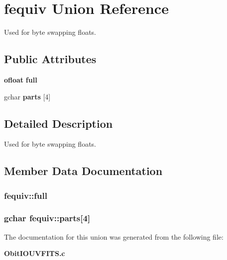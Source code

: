\section{fequiv Union Reference}
\label{unionfequiv}
Used for byte swapping floats.  


\subsection*{Public Attributes}
\begin{CompactItemize}
\item 
{\bf ofloat} {\bf full}
\item 
gchar {\bf parts} [4]
\end{CompactItemize}


\subsection{Detailed Description}
Used for byte swapping floats. 



\subsection{Member Data Documentation}
\subsubsection{ {\bf fequiv::full}}\label{unionfequiv_o0}


\subsubsection{\setlength{\rightskip}{0pt plus 5cm}gchar {\bf fequiv::parts}[4]}\label{unionfequiv_o1}




The documentation for this union was generated from the following file:\begin{CompactItemize}
\item 
{\bf Obit\-IOUVFITS.c}\end{CompactItemize}
